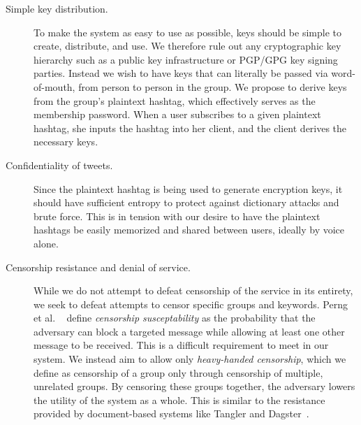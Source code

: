\begin{description}

\item[Simple key distribution.] To make the system as easy to use as
  possible, keys should be simple to create, distribute, and use. We
  therefore rule out any cryptographic key hierarchy such as a public
  key infrastructure or PGP/GPG key signing parties. Instead we wish
  to have keys that can literally be passed via
  word-of-mouth, from person to person in the group. We propose
  to derive keys from the group's plaintext hashtag, which effectively
  serves as the membership password. When a user subscribes to a given plaintext
  hashtag, she inputs the hashtag into her \hoot client, and the client
  derives the necessary keys.

\item[Confidentiality of tweets.] Since the plaintext hashtag is being
  used to generate encryption keys, it should have sufficient entropy to
  protect against dictionary attacks and brute force. This is in tension
  with our desire to have the plaintext hashtags be easily memorized and
  shared between users, ideally by voice alone.

\item[Censorship resistance and denial of service.] While we do not attempt
  to defeat censorship of the \hoot service in its entirety, we seek to
  defeat attempts to censor specific groups and keywords. Perng et
  al.  ~\cite{perng05revisited} define {\em censorship susceptability} as the probability that the
  adversary can block a targeted message while allowing at least one
  other message to be received. This is a
  difficult requirement to meet in our system. We instead aim to allow
  only {\em heavy-handed censorship}, which we define as censorship of a
  group only through censorship of multiple, unrelated groups. By
  censoring these groups together, the adversary lowers the utility of
  the system as a whole. This is similar to the resistance provided by
  document-based systems like Tangler and Dagster~\cite{tangler,dagster}.


\end{description}
